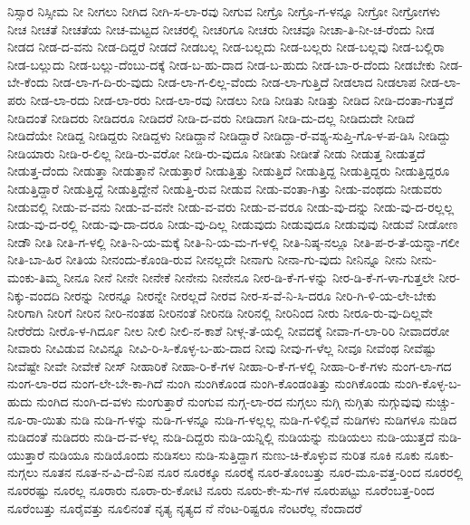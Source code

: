 {ನಿಸ್ಸಾರ
ನಿಸ್ಸೀಮ
ನೀ
ನೀಗಲು
ನೀಗಿದ
ನೀಗಿ-ಸ-ಲಾ-ರವು
ನೀಗುವ
ನೀಗ್ರೊ
ನೀಗ್ರೊ-ಗ-ಳನ್ನೂ
ನೀಗ್ರೋ
ನೀಗ್ರೋಗಳು
ನೀಚ
ನೀಚತೆ
ನೀಚತೆಯ
ನೀಚ-ಮಟ್ಟದ
ನೀಚರಲ್ಲಿ
ನೀಚರಿಗೂ
ನೀಚರು
ನೀಚವೂ
ನೀಚಾ-ತಿ-ನೀ-ಚ-ರೆಂದು
ನೀಡ
ನೀಡದ
ನೀಡ-ದ-ವನು
ನೀಡ-ದಿದ್ದರೆ
ನೀಡದೆ
ನೀಡಬಲ್ಲ
ನೀಡ-ಬಲ್ಲದು
ನೀಡ-ಬಲ್ಲರು
ನೀಡ-ಬಲ್ಲವು
ನೀಡ-ಬಲ್ಲಿರಾ
ನೀಡ-ಬಲ್ಲುದು
ನೀಡ-ಬಲ್ಲು-ದೆಂಬು-ದಕ್ಕೆ
ನೀಡ-ಬ-ಹು-ದಾದ
ನೀಡ-ಬ-ಹುದು
ನೀಡ-ಬಾ-ರ-ದೆಂದು
ನೀಡಬೇಕು
ನೀಡ-ಬೇ-ಕೆಂದು
ನೀಡ-ಲಾ-ಗ-ದಿ-ರು-ವುದು
ನೀಡ-ಲಾ-ಗ-ಲಿಲ್ಲ-ವೆಂದು
ನೀಡ-ಲಾ-ಗುತ್ತಿದೆ
ನೀಡಲಾದ
ನೀಡಲಾಪ
ನೀಡ-ಲಾ-ಪರು
ನೀಡ-ಲಾ-ರದು
ನೀಡ-ಲಾ-ರರು
ನೀಡ-ಲಾ-ರವು
ನೀಡಲು
ನೀಡಿ
ನೀಡಿತು
ನೀಡಿತ್ತು
ನೀಡಿದ
ನೀಡಿ-ದಂತಾ-ಗುತ್ತದೆ
ನೀಡಿದಂತೆ
ನೀಡಿದರು
ನೀಡಿದರೂ
ನೀಡಿದರೆ
ನೀಡಿ-ದ-ವರು
ನೀಡಿದಾಗ
ನೀಡಿ-ದು-ದಲ್ಲ
ನೀಡಿದುದೇ
ನೀಡಿದೆ
ನೀಡಿದೆಯೇ
ನೀಡಿದ್ದ
ನೀಡಿದ್ದರು
ನೀಡಿದ್ದಳು
ನೀಡಿದ್ದಾನೆ
ನೀಡಿದ್ದಾರೆ
ನೀಡಿದ್ದಾ-ರೆ-ವಶ್ಯ-ಸುಪ್ತಿ-ಗೊ-ಳ-ಪ-ಡಿಸಿ
ನೀಡಿದ್ದು
ನೀಡಿಯಾರು
ನೀಡಿ-ರ-ಲಿಲ್ಲ
ನೀಡಿ-ರು-ವರೋ
ನೀಡಿ-ರು-ವುದೂ
ನೀಡೀತು
ನೀಡೀತೆ
ನೀಡು
ನೀಡುತ್ತ
ನೀಡುತ್ತದೆ
ನೀಡುತ್ತ-ದೆಂದು
ನೀಡುತ್ತಾ
ನೀಡುತ್ತಾನೆ
ನೀಡುತ್ತಾರೆ
ನೀಡುತ್ತಿತ್ತು
ನೀಡುತ್ತಿದೆ
ನೀಡುತ್ತಿದ್ದ
ನೀಡುತ್ತಿದ್ದರು
ನೀಡುತ್ತಿದ್ದರೂ
ನೀಡುತ್ತಿದ್ದಾರೆ
ನೀಡುತ್ತಿದ್ದೆ
ನೀಡುತ್ತಿದ್ದೇನೆ
ನೀಡುತ್ತಿ-ರುವ
ನೀಡುವ
ನೀಡು-ವಂತಾ-ಗಿತ್ತು
ನೀಡು-ವಂಥದು
ನೀಡುವರು
ನೀಡುವಲ್ಲಿ
ನೀಡು-ವ-ವನು
ನೀಡು-ವ-ವನೇ
ನೀಡು-ವ-ವರು
ನೀಡು-ವ-ವರೂ
ನೀಡು-ವು-ದನ್ನು
ನೀಡು-ವು-ದ-ರಲ್ಲಲ್ಲ
ನೀಡು-ವು-ದ-ರಲ್ಲಿ
ನೀಡು-ವು-ದಾ-ದರೂ
ನೀಡು-ವು-ದಿಲ್ಲ
ನೀಡುವುದು
ನೀಡುವುದೂ
ನೀಡುವುವು
ನೀಡುವೆ
ನೀಡೋಣ
ನೀಡೌ
ನೀತಿ
ನೀತಿ-ಗ-ಳಲ್ಲಿ
ನೀತಿ-ನಿ-ಯ-ಮಕ್ಕೆ
ನೀತಿ-ನಿ-ಯ-ಮ-ಗ-ಳಲ್ಲಿ
ನೀತಿ-ನಿಷ್ಠ-ನಲ್ಲೂ
ನೀತಿ-ಪ-ರ-ತೆ-ಯನ್ನಾ-ಗಲೀ
ನೀತಿ-ಬಾ-ಹಿರ
ನೀತಿಯ
ನೀನಂದು-ಕೊಂಡಿ-ರುವ
ನೀನಲ್ಲದೇ
ನೀನಾಗು
ನೀನಾ-ಗು-ವುದು
ನೀನಿನ್ನೂ
ನೀನು
ನೀನು-ಮಂಕು-ತಿಮ್ಮ
ನೀನೂ
ನೀನೆ
ನೀನೇ
ನೀನೇಕೆ
ನೀನೇನು
ನೀನೇನೂ
ನೀರ-ಡಿ-ಕೆ-ಗ-ಳನ್ನು
ನೀರ-ಡಿ-ಕೆ-ಗ-ಳಾ-ಗುತ್ತಲೇ
ನೀರ-ನಿಕ್ಕು-ವಂದದಿ
ನೀರನ್ನು
ನೀರನ್ನೂ
ನೀರನ್ನೇ
ನೀರಲ್ಲದೆ
ನೀರವ
ನೀರ-ಸ-ವೆ-ನಿ-ಸಿ-ದರೂ
ನೀರಿ-ಗಿ-ಳಿ-ಯ-ಲೇ-ಬೇಕು
ನೀರಿಗಾಗಿ
ನೀರಿಗೆ
ನೀರಿನ
ನೀರಿ-ನಂತಹ
ನೀರಿನಂತೆ
ನೀರಿನಡಿ
ನೀರಿನಲ್ಲಿ
ನೀರಿನಿಂದ
ನೀರು
ನೀರೂ-ರು-ವು-ದಿಲ್ಲವೇ
ನೀರೆರೆದು
ನೀರೊ-ಳ-ಗಿರ್ದೂ
ನೀಲ
ನೀಲಿ
ನೀಲಿ-ನ-ಕಾಶೆ
ನೀಳ್ಗ-ತೆ-ಯಲ್ಲಿ
ನೀವದಕ್ಕೆ
ನೀವಾ-ಗ-ಲಾ-ರಿರಿ
ನೀವಾದರೋ
ನೀವಾರು
ನೀವಿಡುವ
ನೀವಿನ್ನೂ
ನೀವಿ-ರಿ-ಸಿ-ಕೊಳ್ಳ-ಬ-ಹು-ದಾದ
ನೀವು
ನೀವು-ಗ-ಳೆಲ್ಲ
ನೀವೂ
ನೀವೆಂಥ
ನೀವೆಷ್ಟು
ನೀವೆಷ್ಟೇ
ನೀವೇ
ನೀವೇಕೆ
ನೀಸ್
ನೀಹಾರಿಕೆ
ನೀಹಾ-ರಿ-ಕೆ-ಗಳ
ನೀಹಾ-ರಿ-ಕೆ-ಗ-ಳಲ್ಲಿ
ನೀಹಾ-ರಿ-ಕೆ-ಗಳು
ನುಂಗ-ಲಾ-ಗದ
ನುಂಗ-ಲಾ-ರದ
ನುಂಗ-ಲೇ-ಬೇ-ಕಾ-ಗಿದೆ
ನುಂಗಿ
ನುಂಗಿಕೊಂಡ
ನುಂಗಿ-ಕೊಂಡಂತಿತ್ತು
ನುಂಗಿಕೊಂಡು
ನುಂಗಿ-ಕೊಳ್ಳ-ಬ-ಹುದು
ನುಂಗಿದ
ನುಂಗಿ-ದ-ವಳು
ನುಂಗುತ್ತಾರೆ
ನುಂಗುವ
ನುಗ್ಗ-ಲಾ-ರದ
ನುಗ್ಗಲು
ನುಗ್ಗಿ
ನುಗ್ಗಿತು
ನುಗ್ಗುವುವು
ನುಚ್ಚು-ನೂ-ರಾ-ಯಿತು
ನುಡಿ
ನುಡಿ-ಗ-ಳನ್ನು
ನುಡಿ-ಗ-ಳನ್ನೂ
ನುಡಿ-ಗ-ಳಲ್ಲಲ್ಲ
ನುಡಿ-ಗ-ಳಿಲ್ಲಿವೆ
ನುಡಿಗಳು
ನುಡಿಗಳೂ
ನುಡಿದ
ನುಡಿದಂತೆ
ನುಡಿದರು
ನುಡಿ-ದ-ವ-ಳಲ್ಲ
ನುಡಿ-ದಿದ್ದರು
ನುಡಿ-ಯನ್ನಿಲ್ಲಿ
ನುಡಿಯನ್ನು
ನುಡಿಯಲು
ನುಡಿ-ಯುತ್ತದೆ
ನುಡಿ-ಯುತ್ತಾರೆ
ನುಡಿಯೂ
ನುಡಿಯೊಂದು
ನುಡಿಸಲು
ನುಡಿ-ಸುತ್ತಿದ್ದಾಗ
ನುಣು-ಚಿ-ಕೊಳ್ಳುವ
ನುರಿತ
ನೂಕಿ
ನೂಕು
ನೂಕು-ನುಗ್ಗಲು
ನೂತನ
ನೂತ-ನ-ವಿ-ದೆ-ನಿಪ
ನೂರ
ನೂರಕ್ಕೂ
ನೂರಕ್ಕೆ
ನೂರ-ತೊಂಬತ್ತು
ನೂರ-ಮೂ-ವತ್ತ-ರಿಂದ
ನೂರರಲ್ಲಿ
ನೂರರಷ್ಟು
ನೂರಲ್ಲ
ನೂರಾರು
ನೂರಾ-ರು-ಕೋಟಿ
ನೂರು
ನೂರು-ಕೇ-ಸು-ಗಳ
ನೂರುಪಟ್ಟು
ನೂರೆಂಬತ್ತ-ರಿಂದ
ನೂರೆಂಬತ್ತು
ನೂರೈವತ್ತು
ನೂಲಿನಂತೆ
ನೃತ್ಯ
ನೃತ್ಯದ
ನೆ
ನೆಂಟ-ರಿಷ್ಟರೂ
ನೆಂಟರೆಲ್ಲ
ನೆಂದಾದರೆ
}
